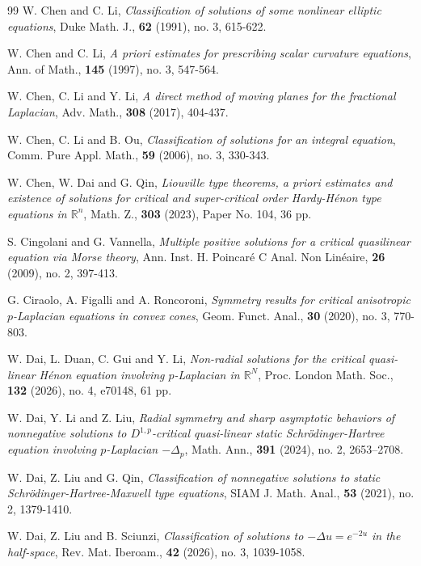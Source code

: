 \documentclass[12pt]{amsart}
\theoremstyle{definition}
\theoremstyle{remark}
\theoremstyle{conclusion}
\theoremstyle{conjecture}
\numberwithin{equation}{section}
\begin{document}
\begin{thebibliography}{99}
 W. Chen and C. Li, {\it Classification of solutions of some nonlinear elliptic equations}, Duke Math. J., \textbf{62} (1991), no. 3, 615-622.

 W. Chen and C. Li, {\it A priori estimates for prescribing scalar curvature equations}, Ann. of Math., \textbf{145} (1997), no. 3, 547-564.

 W. Chen, C. Li and Y. Li, {\it A direct method of moving planes for the fractional Laplacian}, Adv. Math., \textbf{308} (2017), 404-437.

 W. Chen, C. Li and B. Ou, {\it Classification of solutions for an integral equation}, Comm. Pure Appl. Math., \textbf{59} (2006), no. 3, 330-343.

 W. Chen, W. Dai and G. Qin, {\it Liouville type theorems, a priori estimates and existence of solutions for critical and super-critical order Hardy-H\'{e}non type equations in $\mathbb{R}^n$}, Math. Z., \textbf{303} (2023), Paper No. 104, 36 pp.

 S. Cingolani and G. Vannella, {\it Multiple positive solutions for a critical quasilinear equation via Morse theory}, Ann. Inst. H. Poincar\'{e} C Anal. Non Lin\'{e}aire, \textbf{26} (2009), no. 2, 397-413.

 G. Ciraolo, A. Figalli and A. Roncoroni, {\it Symmetry results for critical anisotropic $p$-Laplacian equations in convex cones}, Geom. Funct. Anal., \textbf{30} (2020), no. 3, 770-803.

 W. Dai, L. Duan, C. Gui and Y. Li, {\it Non-radial solutions for the critical quasi-linear H\'{e}non equation involving $p$-Laplacian in $\mathbb{R}^N$}, Proc. London Math. Soc., \textbf{132} (2026), no. 4, e70148, 61 pp.

 W. Dai, Y. Li and Z. Liu, {\it Radial symmetry and sharp asymptotic behaviors of nonnegative solutions to $D^{1,p} $-critical quasi-linear static Schr\"{o}dinger-Hartree equation involving $p$-Laplacian $-\Delta_ {p}$}, Math. Ann., \textbf{391} (2024), no. 2, 2653--2708.

 W. Dai, Z. Liu and G. Qin, {\it Classification of nonnegative solutions to static Schr\"{o}dinger-Hartree-Maxwell type equations}, SIAM J. Math. Anal., \textbf{53} (2021), no. 2, 1379-1410.

 W. Dai, Z. Liu and B. Sciunzi, {\it Classification of solutions to $-\Delta u=e^{-2u}$ in the half-space}, Rev. Mat. Iberoam., \textbf{42} (2026), no. 3, 1039-1058.


\end{thebibliography}
\end{document}
